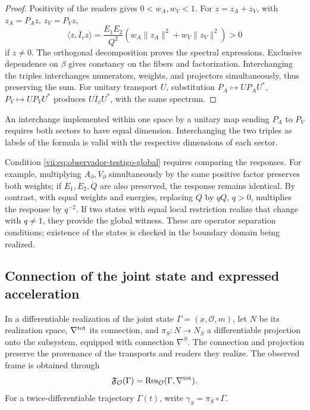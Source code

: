 \begin{proof}
Positivity of the readers gives \(0<w_A,w_V<1\). For
\(z=z_A+z_V\), with \(z_A=P_Az\), \(z_V=P_Vz\),
\[
 \langle z,\overline I_vz\rangle
 =\frac{E_1E_2}{Q^2}
   (w_A\|z_A\|^2+w_V\|z_V\|^2)>0
\]
if \(z\neq0\). The orthogonal decomposition proves the spectral
expressions. Exclusive dependence on \(\beta\) gives constancy
on the fibers and factorization. Interchanging the triples
interchanges numerators, weights, and projectors simultaneously,
thus preserving the sum. For unitary transport \(U\), substitution
\(P_A\mapsto UP_AU^*\), \(P_V\mapsto UP_VU^*\) produces
\(U\overline I_vU^*\), with the same spectrum.
\end{proof}

An interchange implemented within one space by a unitary map
sending \(P_A\) to \(P_V\) requires both sectors to have
equal dimension. Interchanging the two triples as labels of the
formula is valid with the respective dimensions of each sector.

Condition \eqref{vii:eq:observador-testigo-global} requires comparing
the responses. For example, multiplying
\(A_\partial,V_\partial\) simultaneously by the same positive factor preserves
both weights; if \(E_1,E_2,Q\) are also preserved, the response
remains identical. By contrast, with equal weights and energies, replacing
\(Q\) by \(qQ\), \(q>0\), multiplies the response by \(q^{-2}\).
If two states with equal local restriction realize that change with
\(q\neq1\), they provide the global witness. These are operator
separation conditions; existence of the states is checked
in the boundary domain being realized.

\subsection{Connection of the joint state and expressed acceleration}
\label{vii:sec:observador-autoinercia}

In a differentiable realization of the joint state
\(\Gamma=(x,\mathcal O,m)\), let \(N\) be its realization space,
\(\nabla^{\rm tot}\) its connection, and \(\pi_S:N\to N_S\) a
differentiable projection onto the subsystem, equipped with connection
\(\nabla^S\). The connection and projection preserve the provenance
of the transports and readers they realize. The observed frame is
obtained through
\[
 \mathfrak F_{\mathcal O}(\Gamma)
 =\operatorname{Res}_{\mathcal O}(\Gamma,\nabla^{\rm tot}).
\]
For a twice-differentiable trajectory \(\Gamma(t)\),
write \(\gamma_S=\pi_S\circ\Gamma\).

